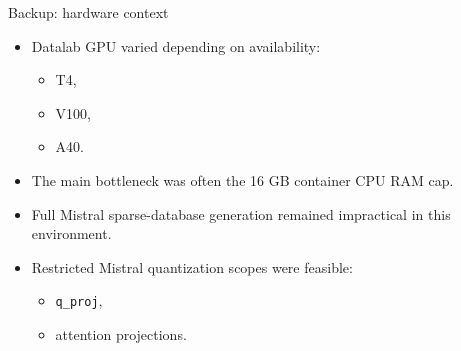 \documentclass[aspectratio=169]{beamer}
\begin{document}
\begin{frame}{Backup: hardware context}
\begin{itemize}
    \item Datalab GPU varied depending on availability:
    \begin{itemize}
        \item T4,
        \item V100,
        \item A40.
    \end{itemize}
    \item The main bottleneck was often the 16 GB container CPU RAM cap.
    \item Full Mistral sparse-database generation remained impractical in this environment.
    \item Restricted Mistral quantization scopes were feasible:
    \begin{itemize}
        \item \texttt{q\_proj},
        \item attention projections.
    \end{itemize}
\end{itemize}
\end{frame}
\end{document}
